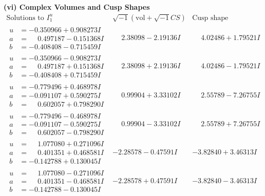 \documentclass[1p]{elsarticle_modified}
\theoremstyle{definition}
\newcommand{\I}{\sqrt{-1}}
\begin{document}
\newpage\flushleft \textbf{(vi) Complex Volumes and Cusp Shapes}
$$\begin{array}{c|c|c}  
\text{Solutions to }I^u_{1}& \I (\text{vol} + \sqrt{-1}CS) & \text{Cusp shape}\\
 \hline 
\begin{aligned}
u &= -0.350966 + 0.908273 I \\
a &= \phantom{-}0.497187 - 0.151368 I \\
b &= -0.408408 - 0.715459 I\end{aligned}
 & \phantom{-}2.38098 - 2.19136 I & \phantom{-}4.02486 + 1.79521 I \\ \hline\begin{aligned}
u &= -0.350966 - 0.908273 I \\
a &= \phantom{-}0.497187 + 0.151368 I \\
b &= -0.408408 + 0.715459 I\end{aligned}
 & \phantom{-}2.38098 + 2.19136 I & \phantom{-}4.02486 - 1.79521 I \\ \hline\begin{aligned}
u &= -0.779496 + 0.468978 I \\
a &= -0.091107 + 0.590275 I \\
b &= \phantom{-}0.602057 + 0.798290 I\end{aligned}
 & \phantom{-}0.99904 + 3.33102 I & \phantom{-}2.55789 - 7.26755 I \\ \hline\begin{aligned}
u &= -0.779496 - 0.468978 I \\
a &= -0.091107 - 0.590275 I \\
b &= \phantom{-}0.602057 - 0.798290 I\end{aligned}
 & \phantom{-}0.99904 - 3.33102 I & \phantom{-}2.55789 + 7.26755 I \\ \hline\begin{aligned}
u &= \phantom{-}1.077080 + 0.271096 I \\
a &= \phantom{-}0.401351 + 0.468581 I \\
b &= -0.142788 + 0.130045 I\end{aligned}
 & -2.28578 - 0.47591 I & -3.82840 + 3.46313 I \\ \hline\begin{aligned}
u &= \phantom{-}1.077080 - 0.271096 I \\
a &= \phantom{-}0.401351 - 0.468581 I \\
b &= -0.142788 - 0.130045 I\end{aligned}
 & -2.28578 + 0.47591 I & -3.82840 - 3.46313 I \\ \hline\begin{aligned}

\end{aligned}
\end{array}$$
\end{document}
